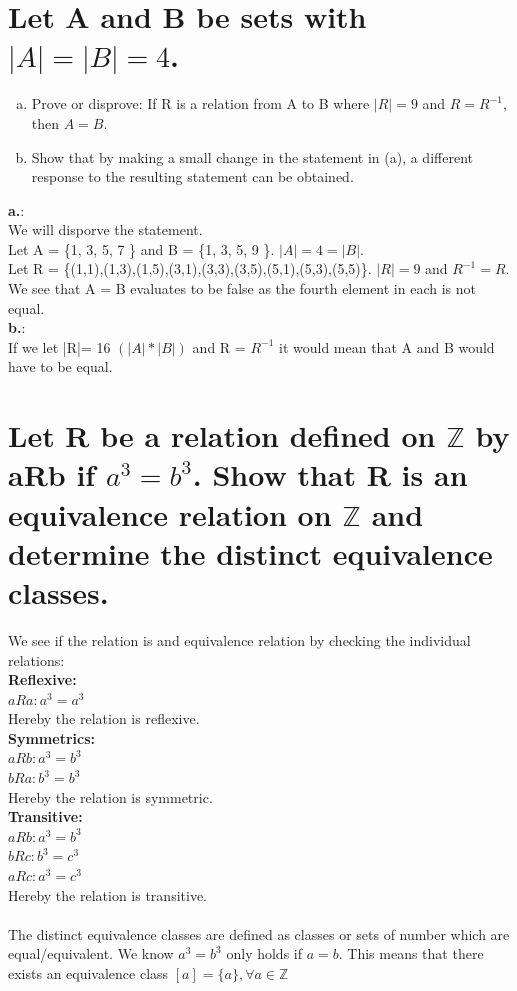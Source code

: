 \section{Let A and B be sets with $|A|=|B|=4$.}
\begin{enumerate}[a.]
\item Prove or disprove: If R is a relation from A to B where $|R|=9$ and $R = R^{-1}$, then $A=B$.
\item Show that by making a small change in the statement in (a), a different response to the resulting statement can be obtained.
\end{enumerate}
\textbf{a.}:\\
We will disporve the statement.\\
Let A = \{1, 3, 5, 7 \} and B = \{1, 3, 5, 9 \}.  $|A| = 4 = |B|$.\\
Let R = \{(1,1),(1,3),(1,5),(3,1),(3,3),(3,5),(5,1),(5,3),(5,5)\}. $|R|=9$ and $R^{-1} = R$.\\
We see that A = B evaluates to be false as the fourth element in each is not equal.\\
\textbf{b.}:\\
If we let |R|= 16 $(|A| * |B|)$ and R = $R^{-1}$ it would mean that A and B would have to be equal.
\newpage
\section{Let R be a relation defined on $\mathbb{Z}$ by aRb if $a^3 = b^3$. Show that R is an equivalence relation on $\mathbb{Z}$ and determine the distinct equivalence classes.}
We see if the relation is and equivalence relation by checking the individual relations:\\
\textbf{Reflexive:}\\
$aRa: a^3=a^3$\\ 
Hereby the relation is reflexive.\\
\textbf{Symmetrics:}\\
$aRb: a^3=b^3$\\
$bRa: b^3=b^3$\\
Hereby the relation is symmetric.\\
\textbf{Transitive:}\\
$aRb: a^3=b^3$\\
$bRc: b^3=c^3$\\
$aRc: a^3=c^3$\\
Hereby the relation is transitive.\\
\\
The distinct equivalence classes are defined as classes or sets of number which are equal/equivalent. We know $a^3=b^3$ only holds if $a=b$. This means that there exists an equivalence class $[a]=\{a\},  \forall a \in \mathbb{Z}$

